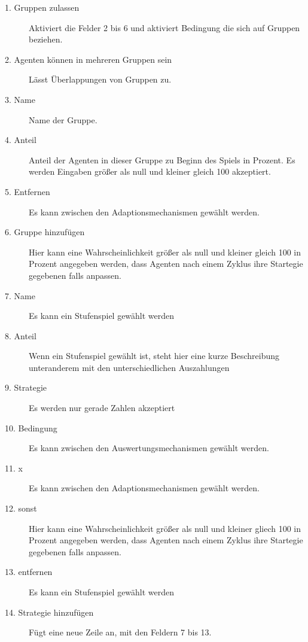 \begin{description}

\item[1. Gruppen zulassen] Aktiviert die Felder 2 bis 6 und aktiviert Bedingung die sich auf Gruppen beziehen.

\item[2. Agenten können in mehreren Gruppen sein] Lässt Überlappungen von Gruppen zu.

\item[3. Name] Name der Gruppe.

\item[4. Anteil] Anteil der Agenten in dieser Gruppe zu Beginn des Spiels in Prozent. Es werden Eingaben größer als null und kleiner gleich 100 akzeptiert.

\item[5. Entfernen] Es kann zwischen den Adaptionsmechanismen gewählt werden.

\item[6. Gruppe hinzufügen] Hier kann eine Wahrscheinlichkeit größer als null und kleiner gleich 100 in Prozent angegeben werden, dass Agenten nach einem Zyklus ihre Startegie gegebenen falls anpassen.

\item[7. Name] Es kann ein Stufenspiel gewählt werden

\item[8. Anteil] Wenn ein Stufenspiel gewählt ist, steht hier eine kurze Beschreibung unteranderem mit den unterschiedlichen Auszahlungen

\item[9. Strategie] Es werden nur gerade Zahlen akzeptiert

\item[10. Bedingung] Es kann zwischen den Auswertungsmechanismen gewählt werden.

\item[11. x] Es kann zwischen den Adaptionsmechanismen gewählt werden.

\item[12. sonst] Hier kann eine Wahrscheinlichkeit größer als null und kleiner gliech 100 in Prozent angegeben werden, dass Agenten nach einem Zyklus ihre Startegie gegebenen falls anpassen.

\item[13. entfernen] Es kann ein Stufenspiel gewählt werden

\item[14. Strategie hinzufügen] Fügt eine neue Zeile an, mit den Feldern 7 bis 13.


\end{description}
